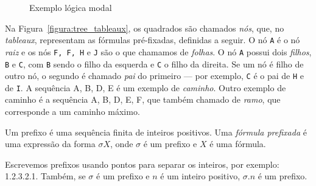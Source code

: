 \begin{figure}
\begin{center}
\label{figure:tree_tableaux}
\caption{Exemplo lógica modal}
\end{center}
\end{figure}

Na Figura~\ref{figura:tree_tableaux}, os quadrados são chamados \textit{nós},
que, no \textit{tableaux}, representam as fórmulas pré-fixadas, definidas a
seguir. O nó \texttt{A} é o nó \textit{raiz} e os nós \texttt{F, F, H} e
\texttt{J} são o que chamamos de \textit{folhas}. O nó \texttt{A} possui dois
\textit{filhos}, \texttt{B} e \texttt{C}, com \texttt{B} sendo o filho da
esquerda e \texttt{C} o filho da direita. Se um nó é filho de outro nó, o
segundo é chamado \textit{pai} do primeiro --- por exemplo, \texttt{C} é o pai
de \texttt{H} e de \texttt{I}.
A sequência A, B, D, E é um exemplo de \textit{caminho}. Outro exemplo de
caminho é a sequência A, B, D, E, F, que também chamado de \textit{ramo}, que
corresponde a um caminho máximo.

\begin{definition}[Prefixo]
   Um prefixo é uma sequência finita de inteiros positivos. Uma \textit{fórmula
   prefixada} é uma expressão da forma $\sigma X$, onde $\sigma$ é um prefixo e
   $X$ é uma fórmula.
\end{definition}

Escrevemos prefixos usando pontos para separar os inteiros, por exemplo:
1.2.3.2.1.
Também, se $\sigma$ é um prefixo e $n$ é um inteiro positivo, $\sigma.n$ é um
prefixo.


